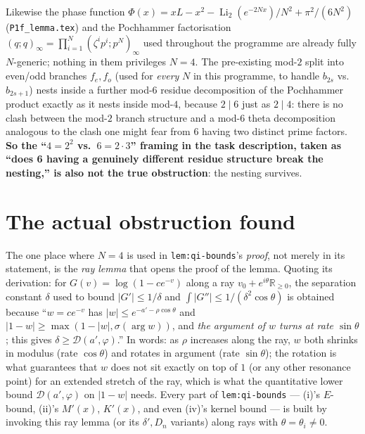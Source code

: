 \documentclass[11pt]{article}
\theoremstyle{plain}
\theoremstyle{remark}
\newcommand{\Li}{\operatorname{Li}_2}
\begin{document}
Likewise the phase function $\Phi(x)=xL-x^2-\Li(e^{-2Nx})/N^2+\pi^2/(6N^2)$ (\texttt{P1f\_lemma.tex}) and
the Pochhammer factorisation $(q;q)_\infty=\prod_{i=1}^N(\zeta^ip^i;p^N)_\infty$ used throughout the
programme are already fully $N$-generic; nothing in them privileges $N=4$. The pre-existing mod-$2$ split
into even/odd branches $f_e,f_o$ (used for \emph{every} $N$ in this programme, to handle $b_{2s}$ vs.\
$b_{2s+1}$) nests inside a further mod-$6$ residue decomposition of the Pochhammer product exactly as it
nests inside mod-$4$, because $2\mid6$ just as $2\mid4$: there is no clash between the mod-$2$ branch
structure and a mod-$6$ theta decomposition analogous to the clash one might fear from $6$ having two
distinct prime factors. \textbf{So the ``$4=2^2$ vs.\ $6=2\cdot3$'' framing in the task description, taken
as ``does 6 having a genuinely different residue structure break the nesting,'' is also not the true
obstruction}: the nesting survives.

\section{The actual obstruction found}
\label{sec:obstruction}

The one place where $N=4$ is used in \texttt{lem:qi-bounds}'s \emph{proof}, not merely in its statement,
is the \emph{ray lemma} that opens the proof of the lemma. Quoting its derivation: for $G(v)=\log(1-ce^{-v})$
along a ray $v_0+e^{i\theta}\mathbb R_{\ge0}$, the separation constant $\delta$ used to bound $|G'|\le1/\delta$
and $\int|G''|\le1/(\delta^2\cos\theta)$ is obtained because ``$w=ce^{-v}$ has $|w|\le e^{-a'-\rho\cos\theta}$
and $|1-w|\ge\max(1-|w|,\sigma(\arg w))$, and \emph{the argument of $w$ turns at rate $\sin\theta$}; this
gives $\delta\ge\mathcal D(a',\varphi)$.'' In words: as $\rho$ increases along the ray, $w$ both shrinks in
modulus (rate $\cos\theta$) and rotates in argument (rate $\sin\theta$); the rotation is what guarantees
that $w$ does not sit exactly on top of $1$ (or any other resonance point) for an extended stretch of the
ray, which is what the quantitative lower bound $\mathcal D(a',\varphi)$ on $|1-w|$ needs. Every part of
\texttt{lem:qi-bounds} --- (i)'s $E$-bound, (ii)'s $M'(x)$, $K'(x)$, and even (iv)'s kernel bound --- is
built by invoking this ray lemma (or its $\delta',D_n$ variants) along rays with $\theta=\theta_i\ne0$.
\end{document}
